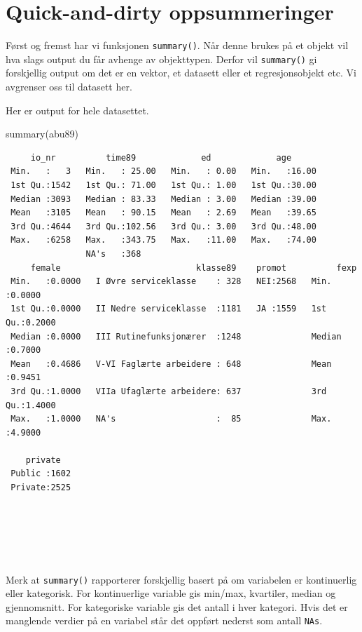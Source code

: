 \documentclass[
  norsk,
  letterpaper,
  DIV=11,
  numbers=noendperiod]{scrreprt}
\newenvironment{Shaded}{\begin{snugshade}}{\end{snugshade}}
\newcommand{\FunctionTok}[1]{\textcolor[rgb]{0.28,0.35,0.67}{#1}}
\newcommand{\NormalTok}[1]{\textcolor[rgb]{0.00,0.23,0.31}{#1}}
\theoremstyle{definition}
\theoremstyle{remark}
\begin{document}
\section{Quick-and-dirty
oppsummeringer}\label{quick-and-dirty-oppsummeringer}

Først og fremst har vi funksjonen \texttt{summary()}. Når denne brukes
på et objekt vil hva slags output du får avhenge av objekttypen. Derfor
vil \texttt{summary()} gi forskjellig output om det er en vektor, et
datasett eller et regresjonsobjekt etc. Vi avgrenser oss til datasett
her.

Her er output for hele datasettet.

\begin{Shaded}
\begin{Highlighting}[]
\FunctionTok{summary}\NormalTok{(abu89)}
\end{Highlighting}
\end{Shaded}

\begin{verbatim}
     io_nr          time89             ed             age       
 Min.   :   3   Min.   : 25.00   Min.   : 0.00   Min.   :16.00  
 1st Qu.:1542   1st Qu.: 71.00   1st Qu.: 1.00   1st Qu.:30.00  
 Median :3093   Median : 83.33   Median : 3.00   Median :39.00  
 Mean   :3105   Mean   : 90.15   Mean   : 2.69   Mean   :39.65  
 3rd Qu.:4644   3rd Qu.:102.56   3rd Qu.: 3.00   3rd Qu.:48.00  
 Max.   :6258   Max.   :343.75   Max.   :11.00   Max.   :74.00  
                NA's   :368                                     
     female                           klasse89    promot          fexp       
 Min.   :0.0000   I Øvre serviceklasse    : 328   NEI:2568   Min.   :0.0000  
 1st Qu.:0.0000   II Nedre serviceklasse  :1181   JA :1559   1st Qu.:0.2000  
 Median :0.0000   III Rutinefunksjonærer  :1248              Median :0.7000  
 Mean   :0.4686   V-VI Faglærte arbeidere : 648              Mean   :0.9451  
 3rd Qu.:1.0000   VIIa Ufaglærte arbeidere: 637              3rd Qu.:1.4000  
 Max.   :1.0000   NA's                    :  85              Max.   :4.9000  
                                                                             
    private    
 Public :1602  
 Private:2525  
               
               
               
               
               
\end{verbatim}

Merk at \texttt{summary()} rapporterer forskjellig basert på om
variabelen er kontinuerlig eller kategorisk. For kontinuerlige variable
gis min/max, kvartiler, median og gjennomsnitt. For kategoriske variable
gis det antall i hver kategori. Hvis det er manglende verdier på en
variabel står det oppført nederst som antall
\texttt{NA\textquotesingle{}s}.
\end{document}
